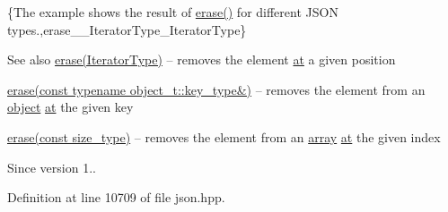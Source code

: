 \{The example shows the result of {\ttfamily \hyperlink{classnlohmann_1_1basic__json_a068a16e76be178e83da6a192916923ed}{erase()}} for different J\+S\+ON types.,erase\+\_\+\+\_\+\+Iterator\+Type\+\_\+\+Iterator\+Type\}

\begin{DoxySeeAlso}{See also}
\hyperlink{classnlohmann_1_1basic__json_a068a16e76be178e83da6a192916923ed}{erase(\+Iterator\+Type)} -- removes the element \hyperlink{classnlohmann_1_1basic__json_a73ae333487310e3302135189ce8ff5d8}{at} a given position 

\hyperlink{classnlohmann_1_1basic__json_a2f8484d69c55d8f2a9697a7bec29362a}{erase(const typename object\+\_\+t\+::key\+\_\+type\&)} -- removes the element from an \hyperlink{classnlohmann_1_1basic__json_aa13f7c0615867542ce80337cbcf13ada}{object} \hyperlink{classnlohmann_1_1basic__json_a73ae333487310e3302135189ce8ff5d8}{at} the given key 

\hyperlink{classnlohmann_1_1basic__json_a88cbcefe9a3f4d294bed0653550a5cb9}{erase(const size\+\_\+type)} -- removes the element from an \hyperlink{classnlohmann_1_1basic__json_aa80485befaffcadaa39965494e0b4d2e}{array} \hyperlink{classnlohmann_1_1basic__json_a73ae333487310e3302135189ce8ff5d8}{at} the given index
\end{DoxySeeAlso}
\begin{DoxySince}{Since}
version 1.. 
\end{DoxySince}


Definition at line 10709 of file json.\+hpp.

